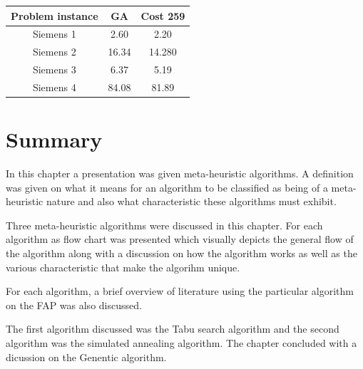 \begin{center}
	\begin{tabular}{| c | c | c |}
	\hline
	Problem instance & GA & Cost 259 \\ \hline
	Siemens 1 & 2.60 & 2.20 \\ \hline
	Siemens 2 & 16.34 & 14.280 \\ \hline
	Siemens 3 & 6.37 & 5.19 \\ \hline
	Siemens 4 & 84.08 & 81.89 \\ \hline
	\end{tabular}
\end{center}
%
\section {Summary}
In this chapter a presentation was given meta-heuristic algorithms. A definition was given on what it means for an algorithm to be classified as being of a meta-heuristic nature and also what characteristic these algorithms must exhibit.

Three meta-heuristic algorithms were discussed in this chapter. For each algorithm as flow chart was presented which visually depicts the general flow of the algorithm along with a discussion on how the algorithm works as well as the various characteristic that make the algorihm unique.

For each algorithm, a brief overview of literature using the particular algorithm on the FAP was also discussed.

The first algorithm discussed was the Tabu search algorithm and the second algorithm was the simulated annealing algorithm. The chapter concluded with a dicussion on the Genentic algorithm. 
